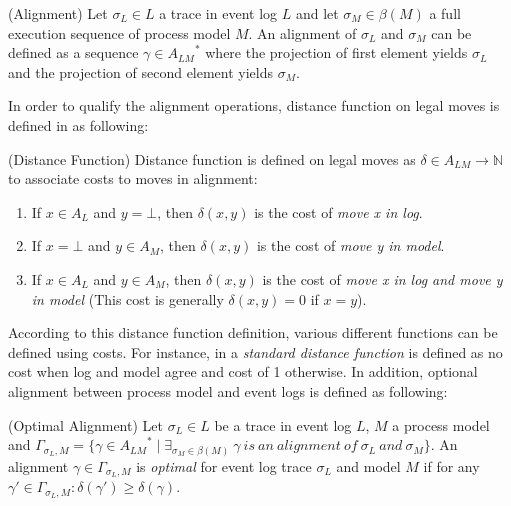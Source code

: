 \theoremstyle{definition}
\begin{definition}{}
(Alignment) Let $\sigma_{L} \in L$ a trace in event log $L$ and let $\sigma_{M} \in \beta (M)$ a full execution sequence of process model $M$. An alignment of $\sigma_{L}$ and $\sigma_{M}$ can be defined as a sequence $\gamma \in {A_{LM}}^{*}$  where the projection of first element yields $\sigma_{L}$ and the projection of second element yields $\sigma_{M}$. 
\end{definition}

In order to qualify the alignment operations, distance function on legal moves is defined in \cite{van2012replaying} as following:
\theoremstyle{definition}
\begin{definition}{}
(Distance Function) Distance function is defined on legal moves as $\delta \in A_{LM} \rightarrow \mathbb{N}$ to associate costs to moves in alignment:
\begin{enumerate}
  \item If $x \in A_{L}$ and $y=\bot$, then  $\delta(x,y)$ is the cost of \textit{move x in log}.
  \item If $x=\bot$ and $y \in A_{M}$, then  $\delta(x,y)$ is the cost of \textit{move y in model}.
  \item If $x \in A_{L}$ and $y \in A_{M}$, then  $\delta(x,y)$ is the cost of \textit{move x in log and move y in model} (This cost is generally $\delta(x,y) = 0$ if $x = y$).
\end{enumerate}
\end{definition}

According to this distance function definition, various different functions can be defined using costs. For instance, in \cite{van2012replaying} a \textit{standard distance function} is defined as no cost when log and model agree and cost of 1 otherwise. In addition, optional alignment between process model and event logs is defined as following:
 
\begin{definition}{}
(Optimal Alignment) Let $\sigma_{L} \in L$ be a trace in event log $L$, $M$ a process model and $\Gamma_{\sigma_{L},M} = \{ \gamma \in {A_{LM}}^{*} \mid \exists_{\sigma_{M} \in \beta (M)}\ \gamma\ is\ an\ alignment\ of\ \sigma_{L}\ and\ \sigma_{M} \}$. An alignment $\gamma \in \Gamma_{\sigma_{L},M}$ is \textit{optimal} for event log trace $\sigma_{L}$ and model $M$ if for any ${\gamma}' \in \Gamma_{\sigma_{L},M} : \delta({\gamma}')\geq \delta(\gamma)$.
\end{definition}

